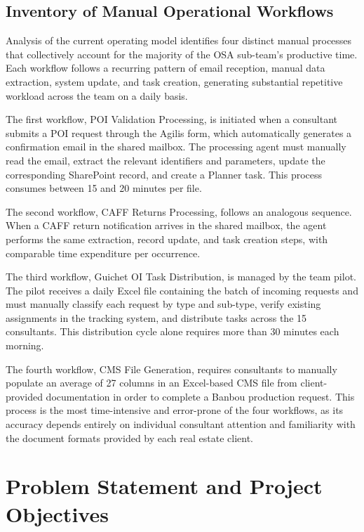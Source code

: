 \subsection{Inventory of Manual Operational Workflows}

Analysis of the current operating model identifies four distinct manual processes that collectively account for the majority of the OSA sub-team's productive time. Each workflow follows a recurring pattern of email reception, manual data extraction, system update, and task creation, generating substantial repetitive workload across the team on a daily basis.

The first workflow, POI Validation Processing, is initiated when a consultant submits a POI request through the Agilis form, which automatically generates a confirmation email in the shared mailbox. The processing agent must manually read the email, extract the relevant identifiers and parameters, update the corresponding SharePoint record, and create a Planner task. This process consumes between 15 and 20 minutes per file.

The second workflow, CAFF Returns Processing, follows an analogous sequence. When a CAFF return notification arrives in the shared mailbox, the agent performs the same extraction, record update, and task creation steps, with comparable time expenditure per occurrence.

The third workflow, Guichet OI Task Distribution, is managed by the team pilot. The pilot receives a daily Excel file containing the batch of incoming requests and must manually classify each request by type and sub-type, verify existing assignments in the tracking system, and distribute tasks across the 15 consultants. This distribution cycle alone requires more than 30 minutes each morning.

The fourth workflow, CMS File Generation, requires consultants to manually populate an average of 27 columns in an Excel-based CMS file from client-provided documentation in order to complete a Banbou production request. This process is the most time-intensive and error-prone of the four workflows, as its accuracy depends entirely on individual consultant attention and familiarity with the document formats provided by each real estate client.

\section{Problem Statement and Project Objectives}

